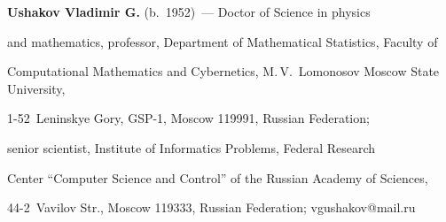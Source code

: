 \noindent


\textbf{Ushakov Vladimir G.} (b.\ 1952)~--- Doctor of Science in physics


and mathematics, professor, Department of Mathematical Statistics, Faculty of 


Computational Mathematics and Cybernetics, M.\,V.~Lomonosov Moscow State University,


1-52~Leninskye Gory, GSP-1, Moscow 119991,  Russian Federation;


senior scientist, Institute of Informatics Problems, Federal Research 


Center ``Computer Science and Control'' of the Russian Academy of Sciences, 


44-2~Vavilov Str., Moscow 119333, Russian Federation; \mbox{vgushakov@mail.ru}





\label{end\stat}





\renewcommand{\bibname}{\protect\rm Литература}       


